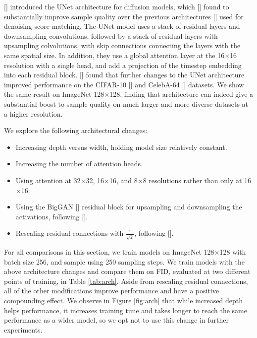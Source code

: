 \citeauthor{ddpm} [] introduced the UNet architecture for diffusion models, which \citeauthor{adversarial} [] found to substantially improve sample quality over the previous architectures [] used for denoising score matching. The UNet model uses a stack of residual layers and downsampling convolutions, followed by a stack of residual layers with upsampling colvolutions, with skip connections connecting the layers with the same spatial size. In addition, they use a global attention layer at the 16$\times$16 resolution with a single head, and add a projection of the timestep embedding into each residual block. \citeauthor{sde} [] found that further changes to the UNet architecture improved performance on the CIFAR-10 [] and CelebA-64 [] datasets. We show the same result on ImageNet 128$\times$128, finding that architecture can indeed give a substantial boost to sample quality on much larger and more diverse datasets at a higher resolution.

We explore the following architectural changes:

\begin{itemize}
  \item Increasing depth versus width, holding model size relatively constant.
  \item Increasing the number of attention heads.
  \item Using attention at 32$\times$32, 16$\times$16, and 8$\times$8 resolutions rather than only at 16$\times$16.
  \item Using the BigGAN [] residual block for upsampling and downsampling the activations, following [].
  \item Rescaling residual connections with $\frac{1}{\sqrt{2}}$, following [].
\end{itemize}

For all comparisons in this section, we train models on ImageNet 128$\times$128 with batch size 256, and sample using 250 sampling steps. We train models with the above architecture changes and compare them on FID, evaluated at two different points of training, in Table \ref{tab:arch}. Aside from rescaling residual connections, all of the other modifications improve performance and have a positive compounding effect. We observe in Figure \ref{fig:arch} that while increased depth helps performance, it increases training time and takes longer to reach the same performance as a wider model, so we opt not to use this change in further experiments. 

